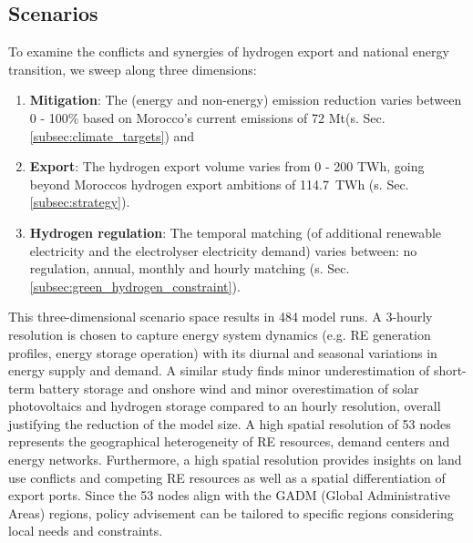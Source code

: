 \subsection{Scenarios}
\label{subsec:scenarios}
To examine the conflicts and synergies of hydrogen export and national energy transition, we sweep along three dimensions:
\begin{enumerate}
    \item \textbf{Mitigation}: The (energy and non-energy) emission reduction varies between 0 - 100\% based on Morocco's current emissions of 72 Mt\coe (s. Sec. \ref{subsec:climate_targets}) and
    \item \textbf{Export}: The hydrogen export volume varies from 0 - 200 TWh, going beyond Moroccos hydrogen export ambitions of 114.7~TWh (s. Sec. \ref{subsec:strategy}).
    \item \textbf{Hydrogen regulation}: The temporal matching (of additional renewable electricity and the electrolyser electricity demand) varies between: no regulation, annual, monthly and hourly matching (s. Sec. \ref{subsec:green_hydrogen_constraint}). 
\end{enumerate}
This three-dimensional scenario space results in 484 model runs. A 3-hourly resolution is chosen to capture energy system dynamics (e.g. RE generation profiles, energy storage operation) with its diurnal and seasonal variations in energy supply and demand. A similar study \cite{Neumann2022} finds minor underestimation of short-term battery storage and onshore wind and minor overestimation of solar photovoltaics and hydrogen storage compared to an hourly resolution, overall justifying the reduction of the model size. A high spatial resolution of 53 nodes represents the geographical heterogeneity of RE resources, demand centers and energy networks. Furthermore, a high spatial resolution provides insights on land use conflicts and competing RE resources as well as a spatial differentiation of export ports. Since the 53 nodes align with the GADM (Global Administrative Areas) regions, policy advisement can be tailored to specific regions considering local needs and constraints.




